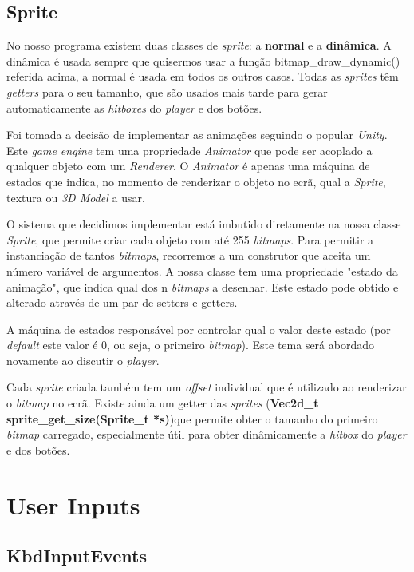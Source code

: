 \documentclass{report}
\begin{document}
\subsection{Sprite}

No nosso programa existem duas classes de \textit{sprite}: a \textbf{normal} e a \textbf{dinâmica}. A dinâmica é usada sempre que quisermos usar a função bitmap\_draw\_dynamic() referida acima, a normal é usada em todos os outros casos. Todas as \textit{sprites} têm \textit{getters} para o seu tamanho, que são usados mais tarde para gerar automaticamente as \textit{hitboxes} do \textit{player} e dos botões.

Foi tomada a decisão de implementar as animações seguindo o popular \textit{Unity}. Este \textit{game engine} tem uma propriedade \textit{Animator} que pode ser acoplado a qualquer objeto com um \textit{Renderer}. O \textit{Animator} é apenas uma máquina de estados que indica, no momento de renderizar o objeto no ecrã, qual a \textit{Sprite}, textura ou \textit{3D Model} a usar.

O sistema que decidimos implementar está imbutido diretamente na nossa classe \textit{Sprite}, que permite criar cada objeto com até 255 \textit{bitmaps}. Para permitir a instanciação de tantos \textit{bitmaps}, recorremos a um construtor que aceita um número variável de argumentos. A nossa classe tem uma propriedade "estado da animação", que indica qual dos n \textit{bitmaps} a desenhar. Este estado pode obtido e alterado através de um par de setters e getters.

A máquina de estados responsável por controlar qual o valor deste estado (por \textit{default} este valor é 0, ou seja, o primeiro \textit{bitmap}). Este tema será abordado novamente ao discutir o \textit{player}.

Cada \textit{sprite} criada também tem um \textit{offset} individual que é utilizado ao renderizar o \textit{bitmap} no ecrã. Existe ainda um getter das \textit{sprites} (\textbf{Vec2d\_t sprite\_get\_size(Sprite\_t *s)})que permite obter o tamanho do primeiro \textit{bitmap} carregado, especialmente útil para obter dinâmicamente a \textit{hitbox} do \textit{player} e dos botões.\newline

\section{User Inputs}

\subsection{KbdInputEvents}
\end{document}
